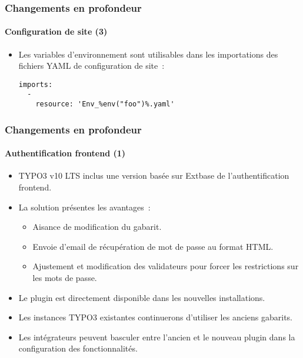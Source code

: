 
\begin{frame}[fragile]
	\frametitle{Changements en profondeur}
	\framesubtitle{Configuration de site (3)}

	\lstset{basicstyle=\tiny\ttfamily}

	\begin{itemize}

		\item Les variables d'environnement sont utilisables dans les importations des fichiers YAML de
			configuration de site~:
\begin{lstlisting}
imports:
  -
    resource: 'Env_%env("foo")%.yaml'
\end{lstlisting}

	\end{itemize}

\end{frame}


\begin{frame}[fragile]
	\frametitle{Changements en profondeur}
	\framesubtitle{Authentification frontend (1)}

	\begin{itemize}

		\item TYPO3 v10 LTS inclus une version basée sur Extbase de l'authentification frontend.
		\item La solution présentes les avantages~:

			\begin{itemize}
				\item Aisance de modification du gabarit.
				\item Envoie d'email de récupération de mot de passe au format HTML\@.
				\item Ajustement et modification des validateurs pour forcer les restrictions sur les mots de passe.
			\end{itemize}

		\item Le plugin est directement disponible dans les nouvelles installations.
		\item Les instances TYPO3 existantes continuerons d'utiliser les anciens gabarits.
		\item Les intégrateurs peuvent basculer entre l'ancien et le nouveau plugin dans la configuration des fonctionnalités.

	\end{itemize}

\end{frame}

